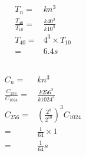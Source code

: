 \documentclass{article}
\begin{document}
    \section{}
        \subsection{}
            \paragraph{
                \begin{equation*}
                    \begin{split}
                        T_n=&kn^3\\
                        \frac{T_{40}}{T_{10}}=&\frac{k40^3}{k10^3}\\
                        T_{40}=&4^3\times T_{10}\\
                        =&6.4 s
                    \end{split}
                \end{equation*}
            }
        \subsection{}
            \paragraph{
                \begin{equation*}
                    \begin{split}
                        C_n=&kn^3\\
                        \frac{C_{256}}{C_{1024}}=&\frac{k256^3}{k1024^3}\\
                        C_{256}=&(\frac{2^8}{2^10})^3C_{1024}\\
                        =&\frac{1}{64}\times 1\\
                        =&\frac{1}{64}s 
                    \end{split}
                \end{equation*}
            }
\end{document}
